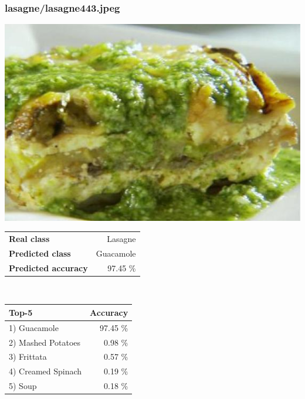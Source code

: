 \subsubsection{lasagne/lasagne443.jpeg}

\begin{minipage}[t]{0.4\textwidth}
	\vspace{0pt}
	\includegraphics[width=\linewidth]{images/evaluation-images/lasagne/lasagne443.jpeg}
\end{minipage}
\hfill
\begin{minipage}[t]{0.5\textwidth}
	\vspace{0pt}\raggedright
	\begin{tabularx}{\textwidth}{X r}
		\small \textbf{Real class} & \small Lasagne\\
		\small \textbf{Predicted class} & \small Guacamole\\
		\small \textbf{Predicted accuracy} & \small 97.45 \%
    \end{tabularx}\\
    
    \vspace{6pt}
	\begin{tabularx}{\textwidth}{X r}
        \small \textbf{Top-5} & \small \textbf{Accuracy} \\
        \hline
		\small 1) Guacamole & \small 97.45 \%\\\small 2) Mashed Potatoes & \small 0.98 \%\\\small 3) Frittata & \small 0.57 \%\\\small 4) Creamed Spinach & \small 0.19 \%\\\small 5) Soup & \small 0.18 \%
    \end{tabularx}
\end{minipage}
    
